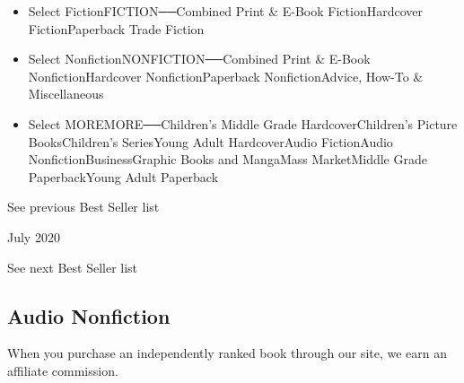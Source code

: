 \begin{itemize}
\tightlist
\item
  Select FictionFICTION──Combined Print \& E-Book FictionHardcover
  FictionPaperback Trade Fiction
\item
  Select NonfictionNONFICTION──Combined Print \& E-Book
  NonfictionHardcover NonfictionPaperback NonfictionAdvice, How-To \&
  Miscellaneous
\item
  Select MOREMORE──Children's Middle Grade HardcoverChildren's Picture
  BooksChildren's SeriesYoung Adult HardcoverAudio FictionAudio
  NonfictionBusinessGraphic Books and MangaMass MarketMiddle Grade
  PaperbackYoung Adult Paperback
\end{itemize}

\href{/books/best-sellers/2020/06/01/audio-nonfiction/}{}

See previous Best Seller list

July 2020

See next Best Seller list

\hypertarget{audio-nonfiction}{%
\subsection{Audio Nonfiction}\label{audio-nonfiction}}

When you purchase an independently ranked book through our site, we earn
an affiliate commission.

